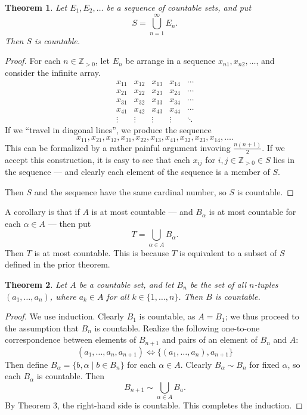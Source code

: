 \documentclass[11pt]{article}
\newtheorem{theorem}{Theorem}
\begin{document}
\begin{theorem}
	Let $E_{1}, E_{2}, \ldots$ be a sequence of countable sets, and put
	\[
		S = \bigcup\limits_{n = 1}^{\infty} E_{n}.
	\]
	Then $S$ is countable.
\end{theorem}
\begin{adjustwidth}{1cm}{}
	\begin{proof}
		For each $n \in \mathbb{Z}_{> 0}$, let $E_{n}$ be arrange in a sequence $x_{n1}, x_{n2}, \ldots$, and consider the infinite array.
		\[
			\begin{array}{ccccc}
				x_{11} & x_{12} & x_{13} & x_{14} & \cdots \\
				x_{21} & x_{22} & x_{23} & x_{24} & \cdots \\
				x_{31} & x_{32} & x_{33} & x_{34} & \cdots \\
				x_{41} & x_{42} & x_{43} & x_{44} & \cdots \\
				\vdots & \vdots & \vdots & \vdots & \ddots
			\end{array}
		\]
		If we ``travel in diagonal lines'', we produce the sequence
		\[
			x_{11}, x_{21}, x_{12}, x_{31}, x_{22}, x_{13}, x_{41}, x_{32}, x_{23}, x_{14}, \ldots.
		\]
		This can be formalized by a rather painful argument invoving $\tfrac{n(n + 1)}{2}$. If we accept this construction, it is easy to see that each $x_{ij}$ for $i, j \in \mathbb{Z}_{> 0} \in S$ lies in the sequence --- and clearly each element of the sequence is a member of $S$. 

		Then $S$ and the sequence have the same cardinal number, so $S$ is countable.
	\end{proof}
\end{adjustwidth}

A corollary is that if $A$ is at most countable --- and $B_{\alpha}$ is at most countable for each $\alpha \in A$ --- then put 
\[
	T = \bigcup\limits_{\alpha \in A} B_{\alpha}.
\]
Then $T$ is at most countable. This is because $T$ is equivalent to a subset of $S$ defined in the prior theorem.

\begin{theorem}
	Let $A$ be a countable set, and let $B_{n}$ be the set of all $n$-tuples $(a_{1}, \ldots, a_{n})$, where $a_{k} \in A$ for all $k \in \{ 1, \ldots, n \}$. Then $B$ is countable.
\end{theorem}
\begin{adjustwidth}{1cm}{}
	\begin{proof}
		We use induction. Clearly $B_{1}$ is countable, as $A = B_{1}$; we thus proceed to the assumption that $B_{n}$ is countable. Realize the following one-to-one correspondence between elements of $B_{n + 1}$ and pairs of an element of $B_{n}$ and $A$:
		\[
			(a_{1}, \ldots, a_{n}, a_{n + 1}) \iff \{(a_{1}, \ldots, a_{n}), a_{n + 1}\}
		\]
		Then define $B_{\alpha} = \{ b, \alpha \mid b \in B_{n} \}$ for each $\alpha \in A$. Clearly $B_{\alpha} \sim B_{n}$ for fixed $\alpha$, so each $B_{\alpha}$ is countable. Then
		\[
			B_{n + 1} \sim \bigcup\limits_{\alpha \in A} B_{a}.
		\]
		By Theorem 3, the right-hand side is countable. This completes the induction.
	\end{proof}
\end{adjustwidth}
\end{document}
